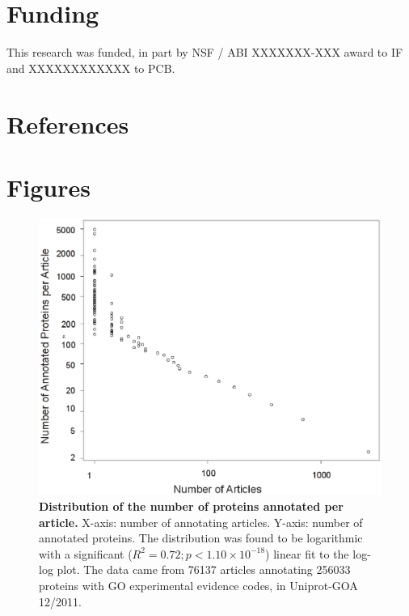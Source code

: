 \documentclass[12pt]{article}
\begin{document}
\section*{Funding}
This research was funded, in part by NSF / ABI XXXXXXX-XXX award to IF and XXXXXXXXXXXX to
PCB.

\section*{References}

\newpage
\section*{Figures}

\begin{figure}[!ht]
\begin{center}
\includegraphics[width=6in]{articles-prots.eps}
\end{center}
\caption{
{\bf Distribution of the number of proteins annotated per article.} X-axis: number of annotating
articles. Y-axis: number of annotated proteins. The distribution was found to be logarithmic with a
significant ($R^2=0.72; p<1.10\times 10^{-18}$) linear fit to the log-log plot. The data came from 76137
articles annotating 256033 proteins with GO experimental evidence codes, in Uniprot-GOA 12/2011.
}
\label{fig:articles-prots}
\end{figure}
\newpage
\end{document}
